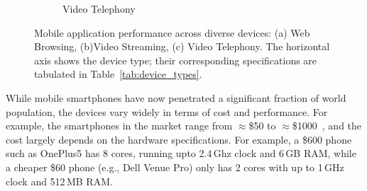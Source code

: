 \begin{figure}[t]
\begin{subfigure}[b]{0.33\textwidth}
        \caption{Video Telephony}
    \end{subfigure}
     \caption{Mobile application performance across diverse devices: (a) Web Browsing, (b)Video Streaming, (c) Video Telephony. The horizontal axis shows the device type; their corresponding specifications are tabulated in Table~\ref{tab:device_types}.}
     \label{fig:motivation}
\end{figure}

\begin{table}[t]
  \centering
  \caption{The table shows the set of diverse mobile devices used in our motivation experiment and their corresponding specifications including cost, CPU capabilities, and memory capacity. }%
  \label{tab:device_types}
\end{table}
While mobile smartphones have now penetrated 
a significant fraction of world population, the devices 
vary widely in terms of cost and performance. 
For example, the smartphones in the market 
range from $\approx$\$50 to $\approx$\$1000~\cite{mobilephones, contreras2017patents}, and the cost 
largely depends on the hardware specifications. 
For example, a \$600 phone such as OnePlus5 has 8 cores, running upto 2.4\,Ghz clock and 6\,GB RAM, while a cheaper \$60 phone (e.g., Dell Venue Pro) only has 2 cores with up to 1\,GHz clock and 512\,MB RAM. 

